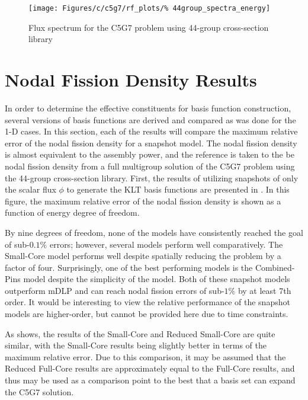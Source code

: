 \begin{figure*}[tb]
    \centering
    \texttt{[image: Figures/c/c5g7/rf\_plots/\%
        44group\_spectra\_energy]}
    \caption{Flux spectrum for the C5G7 problem using 44-group cross-section 
        library}
    \label{fig:c5g7_spectra}
\end{figure*}

\section{Nodal Fission Density Results}

In order to determine the effective constituents for basis function 
construction, several versions of basis functions are derived and compared as 
was done for the 1-D cases.  In this section, each of the results will 
compare the maximum relative error of the nodal fission density for a snapshot 
model.  The nodal fission density is almost equivalent to the assembly power, 
and the reference is taken to the be nodal fission density from a full 
multigroup solution of the C5G7 problem using the 44-group cross-section 
library. First, the results of utilizing snapshots of only the scalar flux 
$\phi$ to generate the KLT basis functions are presented in 
.  In this figure, the maximum relative error of the 
nodal fission density is shown as a function of energy degree of freedom.  

By nine degrees of freedom, none of the models have consistently reached the goal of 
sub-$0.1\%$ errors; however, several models perform well comparatively.  The 
Small-Core model performs well despite spatially reducing the problem by a factor 
of four.  Surprisingly, one of the best performing models is the Combined-Pins model despite the 
simplicity of the model. Both of these snapshot models outperform mDLP and can 
reach nodal fission errors of sub-$1\%$ by at least 7th order.  It would be interesting to view the 
relative performance of the snapshot models are higher-order, but cannot be provided here due to 
time constraints.

As  shows, the results of the Small-Core and 
Reduced Small-Core are quite similar, with the Small-Core results being 
slightly better in terms of the maximum relative error.  Due to this 
comparison, it may be assumed that the Reduced Full-Core results are 
approximately equal to the Full-Core results, and thus may be used as a 
comparison point to the best that a basis set can expand the C5G7 solution.

